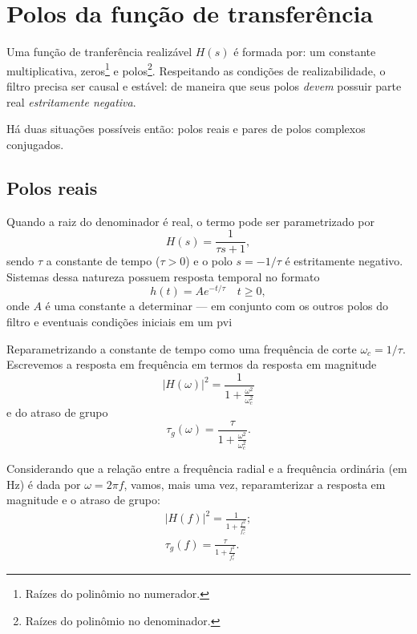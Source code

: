 \section{Polos da função de transferência}

Uma função de tranferência realizável $H(s)$ é formada por: um constante multiplicativa, zeros\footnote{Raízes do polinômio no numerador.} e polos\footnote{Raízes do polinômio no denominador.}. Respeitando as condições de realizabilidade, o filtro precisa ser causal e estável: de maneira que seus polos \emph{devem} possuir parte real \emph{estritamente negativa}.

Há duas situações possíveis então: polos reais e pares de polos complexos conjugados.

\subsection{Polos reais}

Quando a raiz do denominador é real, o termo pode ser parametrizado por
 \begin{equation}
	 H(s)=\frac{1}{\tau s+1},
 \end{equation}
sendo $\tau$ a constante de tempo ($\tau>0$) e o polo $s=-1\slash\tau$ é estritamente negativo. Sistemas dessa natureza possuem resposta temporal no formato
 \begin{equation}
	 h(t)=Ae^{-t\slash\tau}\quad t\geq0,
 \end{equation}
onde $A$ é uma constante a determinar --- em conjunto com os outros polos do filtro e eventuais condições iniciais em um \ac{pvi}

Reparametrizando a constante de tempo como uma frequência de corte $\omega_c=1\slash\tau$. Escrevemos a resposta em frequência em termos da resposta em magnitude
\begin{equation}
	|H(\omega)|^2=\frac{1}{\displaystyle1+\frac{\omega^2}{\omega_c^2}}
\end{equation}
e do atraso de grupo
\begin{equation}
	\tau_g(\omega)=\frac{\tau}{\displaystyle1+\frac{\omega^2}{\omega_c^2}}.
\end{equation}

Considerando que a relação entre a frequência radial e a frequência ordinária (em \unit{\hertz}) é dada por $\omega=2\pi f$, vamos, mais uma vez, reparamterizar a resposta em magnitude e o atraso de grupo:
\begin{gather}
	|H(f)|^2=\frac{1}{\displaystyle1+\frac{f^2}{f_c^2}};\\
	\tau_g(f)=\frac{\tau}{\displaystyle1+\frac{f^2}{f_c^2}}.
\end{gather}

